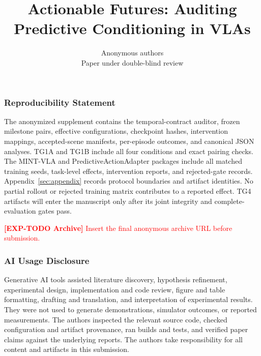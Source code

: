 \documentclass{article}
\title{Actionable Futures: Auditing Predictive Conditioning in VLAs}
\author{Anonymous authors\\
Paper under double-blind review}
\newcommand{\exptodo}[2]{\par\noindent\textcolor{red}{\textbf{[EXP-TODO #1]} #2}}
\begin{document}
\raggedbottom
\maketitle

\begin{abstract}

\end{abstract}


\subsubsection*{Reproducibility Statement}
The anonymized supplement contains the temporal-contract auditor, frozen
milestone pairs, effective configurations, checkpoint hashes, intervention
mappings, accepted-scene manifests, per-episode outcomes, and canonical JSON
analyses.  TG1A and TG1B include all four conditions and exact pairing checks.
The MINT-VLA and PredictiveActionAdapter packages include all matched training
seeds, task-level effects, intervention reports, and rejected-gate records.
Appendix~\ref{sec:appendix} records protocol boundaries and artifact identities.
No partial rollout or rejected training matrix contributes to a reported
effect.  TG4 artifacts will enter the manuscript only after its joint integrity
and complete-evaluation gates pass.
\exptodo{Archive}{Insert the final anonymous archive URL before submission.}

\subsubsection*{AI Usage Disclosure}
Generative AI tools assisted literature discovery, hypothesis refinement,
experimental design, implementation and code review, figure and table
formatting, drafting and translation, and interpretation of experimental
results.  They were not used to generate demonstrations, simulator outcomes,
or reported measurements.  The authors inspected the relevant source code,
checked configuration and artifact provenance, ran builds and tests, and
verified paper claims against the underlying reports.  The authors take
responsibility for all content and artifacts in this submission.




\appendix

\end{document}

